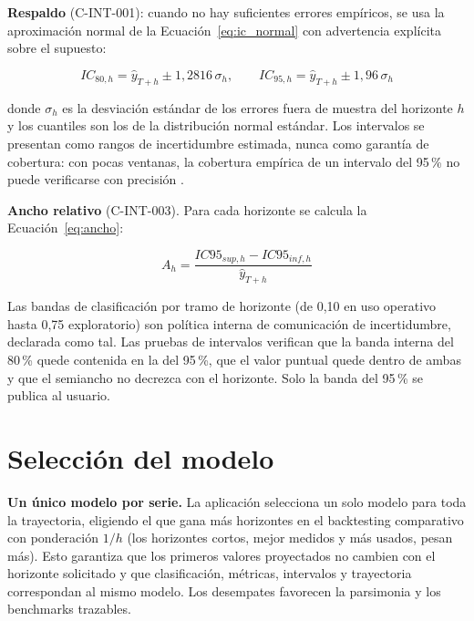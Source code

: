 \documentclass[12pt]{article}
\begin{document}
\textbf{Respaldo} (C-INT-001): cuando no hay suficientes errores emp\'iricos, se usa la aproximaci\'on normal de la Ecuaci\'on~\ref{eq:ic_normal} con advertencia expl\'icita sobre el supuesto:

\begin{equation}
IC_{80,h} = \hat{y}_{T+h} \pm 1{,}2816\,\sigma_h, \qquad IC_{95,h} = \hat{y}_{T+h} \pm 1{,}96\,\sigma_h
\label{eq:ic_normal}
\end{equation}

donde $\sigma_h$ es la desviaci\'on est\'andar de los errores fuera de muestra del horizonte $h$ y los cuantiles son los de la distribuci\'on normal est\'andar. Los intervalos se presentan como rangos de incertidumbre estimada, nunca como garant\'ia de cobertura: con pocas ventanas, la cobertura emp\'irica de un intervalo del 95\,\% no puede verificarse con precisi\'on \citep{hyndman2021fpp3}.

\textbf{Ancho relativo} (C-INT-003). Para cada horizonte se calcula la Ecuaci\'on~\ref{eq:ancho}:

\begin{equation}
A_h = \frac{IC95_{sup,h} - IC95_{inf,h}}{\hat{y}_{T+h}}
\label{eq:ancho}
\end{equation}

Las bandas de clasificaci\'on por tramo de horizonte (de 0,10 en uso operativo hasta 0,75 exploratorio) son pol\'itica interna de comunicaci\'on de incertidumbre, declarada como tal. Las pruebas de intervalos verifican que la banda interna del 80\,\% quede contenida en la del 95\,\%, que el valor puntual quede dentro de ambas y que el semiancho no decrezca con el horizonte. Solo la banda del 95\,\% se publica al usuario.

\section{Selecci\'on del modelo}
\label{sec:seleccion}

\textbf{Un \'unico modelo por serie.} La aplicaci\'on selecciona un solo modelo para toda la trayectoria, eligiendo el que gana m\'as horizontes en el backtesting comparativo con ponderaci\'on $1/h$ (los horizontes cortos, mejor medidos y m\'as usados, pesan m\'as). Esto garantiza que los primeros valores proyectados no cambien con el horizonte solicitado y que clasificaci\'on, m\'etricas, intervalos y trayectoria correspondan al mismo modelo. Los desempates favorecen la parsimonia y los benchmarks trazables.
\end{document}

